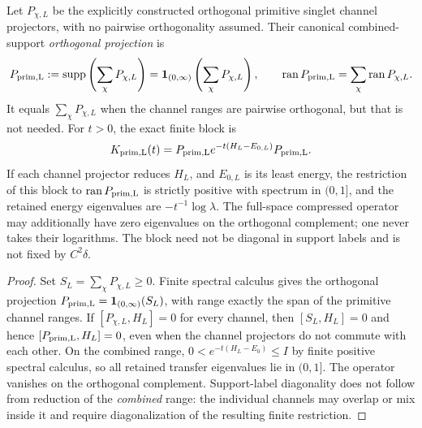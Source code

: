 \documentclass[12pt,a4paper]{article}
\begin{document}
\begin{theorem}
\label{p11:thm:explicit-primitive-support-transfer-block}

Let \(P_{\chi,L}\) be the explicitly constructed orthogonal primitive
singlet channel projectors, with no pairwise orthogonality assumed.
Their canonical combined-support \emph{orthogonal projection} is
\[
P_{\rm prim,L}:=\operatorname{supp}\left(\sum_\chi P_{\chi,L}\right)
=\mathbf1_{(0,\infty)}\left(\sum_\chi P_{\chi,L}\right),\qquad
\operatorname{ran}P_{\rm prim,L}=\sum_\chi\operatorname{ran}P_{\chi,L}.
\]
It equals \(\sum_\chi P_{\chi,L}\) when the channel ranges are pairwise
orthogonal, but that is not needed. For \(t>0\), the exact finite block is
\[
K_{\rm prim,L}(t)=P_{\rm prim,L}e^{-t(H_L-E_{0,L})}P_{\rm prim,L}.
\]
If each channel projector reduces \(H_L\), and \(E_{0,L}\) is its least
energy, the restriction of this block to \(\operatorname{ran}P_{\rm prim,L}\)
is strictly positive with spectrum in \((0,1]\), and the retained energy
eigenvalues are \(-t^{-1}\log\lambda\). The full-space compressed
operator may additionally have zero eigenvalues on the orthogonal
complement; one never takes their logarithms. The block need not be
diagonal in support labels and is not fixed by \(C^2\delta\).
\label{p11:eq:explicit-primitive-transfer-block}
\label{p11:eq:explicit-primitive-hamiltonian-block}
\label{p11:eq:explicit-pure-glue-scalar-transfer-block}
\label{p11:eq:explicit-pure-glue-scalar-hamiltonian-block}
\end{theorem}
\begin{proof}

Set \(S_L=\sum_\chi P_{\chi,L}\ge0\). Finite spectral calculus gives
the orthogonal projection \(P_{\rm prim,L}=\mathbf1_{(0,\infty)}(S_L)\),
with range exactly the span of the primitive channel ranges.
If \([P_{\chi,L},H_L]=0\) for every channel, then \([S_L,H_L]=0\)
and hence \([P_{\rm prim,L},H_L]=0\), even when the channel
projectors do not commute with each other. On the combined range,
\(0<e^{-t(H_L-E_0)}\le I\) by finite positive spectral calculus,
so all retained transfer eigenvalues lie in \((0,1]\). The operator
vanishes on the orthogonal complement. Support-label diagonality does
not follow from reduction of the \emph{combined} range: the individual
channels may overlap or mix inside it and require diagonalization of
the resulting finite restriction.
\end{proof}
\end{document}
